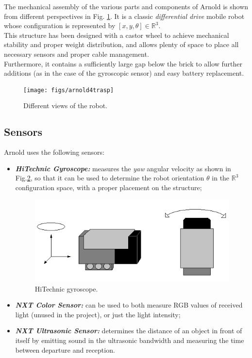 \documentclass[a4paper,11pt,oneside]{book}
\begin{document}
			The mechanical assembly of the various parts and components of Arnold is shown from different perspectives in Fig. \ref{fig:arnold4trasp.png}.
			It is a classic \textit{differential drive} mobile robot whose configuration is represented by $[x,y, \theta] \in \mathbb{R}^3$.\\
			
			This structure has been designed with a castor wheel to achieve mechanical stability and proper weight distribution, and allows plenty of space to place all necessary sensors and proper cable management.\\
			Furthermore, it contains a sufficiently large gap below the brick to allow further additions (as in the case of the gyroscopic sensor) and easy battery replacement.
			
			\begin{figure}
				\centering
				\texttt{[image: figs/arnold4trasp]}
				\caption{Different views of the robot.}\label{fig:arnold4trasp.png}
			\end{figure}
			
			
			\subsection {Sensors}
			
			Arnold uses the following sensors:
			\begin{itemize}
				\item \textit{ \textbf {HiTechnic Gyroscope:}} measures the \textit{yaw} angular velocity as shown in Fig.\ref{fig:gyroscope.png}, so that it can be used to determine the robot orientation $\theta$ in the $\mathbb{R}^3$ configuration space, with a proper placement on the structure;
				\begin{figure}[H]
					\centering
					\includegraphics[scale=0.6]{figs/gyroscope}
					\caption{HiTechnic gyroscope.}\label{fig:gyroscope.png}
				\end{figure}
			
				\item \textit{\textbf {NXT Color Sensor:}} can be used to both measure RGB values of received light (unused in the project), or just the light intensity;
				
				\item \textit{\textbf {NXT Ultrasonic Sensor:}} determines the distance of an object in front of itself by emitting sound in the ultrasonic bandwidth and measuring the time between departure and reception.
				
			\end{itemize}
			
\end{document}
